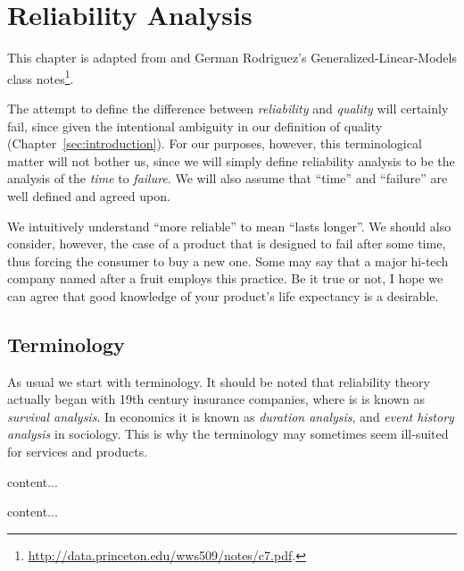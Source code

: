 \chapter{Reliability Analysis}

This chapter is adapted from \cite{natrella_nist/sematech_2010} and German Rodriguez's Generalized-Linear-Models class notes\footnote{\url{http://data.princeton.edu/wws509/notes/c7.pdf}.}.

The attempt to define the difference between \emph{reliability} and \emph{quality} will certainly fail, since given the intentional ambiguity in our definition of quality (Chapter~\ref{sec:introduction}).
For our purposes, however, this terminological matter will not bother us, since we will simply define reliability analysis to be the analysis of the \emph{time} to \emph{failure}.
We will also assume that ``time'' and ``failure'' are well defined and agreed upon.

We intuitively understand ``more reliable'' to mean ``lasts longer''. 
We should also consider, however, the case of a product that is designed to fail after some time, thus forcing the consumer to buy a new one. 
Some may say that a major hi-tech company named after a fruit employs this practice. 
Be it true or not, I hope we can agree that good knowledge of your product's life expectancy is a desirable. 









\section{Terminology}
As usual we start with terminology.
It should be noted that reliability theory actually began with 19th century insurance companies, where is is known as \emph{survival analysis}.
In economics it is known as \emph{duration analysis}, and \emph{event history analysis} in sociology. 
This is why the terminology may sometimes seem ill-suited for services and products. 


\begin{definition}[CDF]
content...
\end{definition}


\begin{definition}[PDF]
content...
\end{definition}



